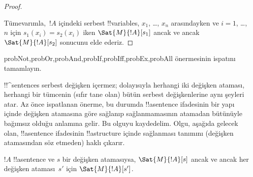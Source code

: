 \begin{proof}
\begin{enumerate}
\end{enumerate}
Tümevarımla,~$!A$ içindeki serbest !!{variable}s, $x_1$, \dots, $x_n$
arasındayken ve $i = 1$, \dots,~$n$ için $s_1(x_i)=s_2(x_i)$ iken
$\Sat{M}{!A}[s_1]$ ancak ve ancak $\Sat{M}{!A}[s_2]$ sonucunu elde
ederiz.
\end{proof}

\begin{probtag}{probNot,probOr,probAnd,probIf,probIff,probEx,probAll}
 önermesinin ispatını tamamlayın.
\end{probtag}

\begin{explain}
!!^{sentence}s serbest değişken içermez; dolayısıyla herhangi iki
değişken ataması, herhangi bir tümcenin (sıfır tane olan) bütün serbest
değişkenlerine aynı şeyleri atar. Az önce ispatlanan önerme, bu durumda
!!a{sentence} ifadesinin bir yapı içinde değişken atamasına göre
sağlanıp sağlanmamasının atamadan bütünüyle bağımsız olduğu anlamına
gelir. Bu olguyu kaydedelim. Olgu, aşağıda gelecek olan, !!a{sentence}
ifadesinin !!a{structure} içinde sağlanması tanımını (değişken
atamasından söz etmeden) haklı çıkarır.
\end{explain}

\begin{cor}
$!A$ !!a{sentence} ve $s$ bir değişken atamasıysa,
$\Sat{M}{!A}[s]$ ancak ve ancak her değişken ataması~$s'$ için
$\Sat{M}{!A}[s']$.
\end{cor}

